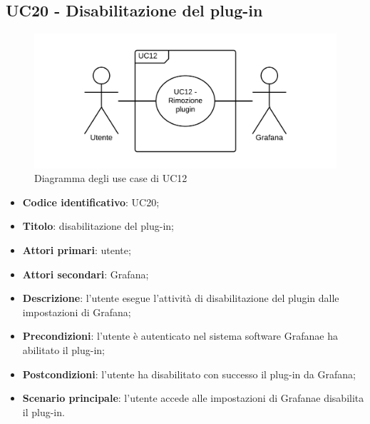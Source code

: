 \subsection{UC20 - Disabilitazione del plug-in}
\begin{figure}[H]
	\includegraphics{img/UC12_-_Rimozione_plugin.png}
	\caption{Diagramma degli use case di UC12}
\end{figure}
\begin{itemize}
	\item \textbf{Codice identificativo}: UC20;
	\item \textbf{Titolo}: disabilitazione del plug-in;
	\item \textbf{Attori primari}: utente;
	\item \textbf{Attori secondari}: Grafana\glo;
	\item \textbf{Descrizione}: l'utente esegue l'attività di disabilitazione del plugin dalle impostazioni di Grafana\glo;
	\item \textbf{Precondizioni}: l'utente è autenticato nel sistema software Grafana\glosp e ha abilitato il plug-in;
	\item \textbf{Postcondizioni}: l'utente ha disabilitato con successo il plug-in da Grafana\glo;
	\item \textbf{Scenario principale}: l'utente accede alle impostazioni di Grafana\glosp e disabilita il plug-in.
\end{itemize}